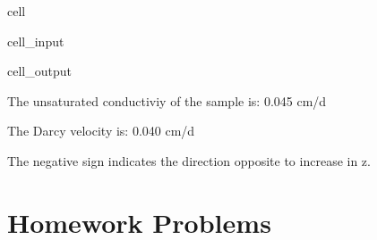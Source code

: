 \documentclass[letterpaper,10pt,english]{jupyterBook}
\begin{document}
\begin{sphinxuseclass}{cell}
\begin{sphinxVerbatimInput}
\begin{sphinxuseclass}{cell_input}
\begin{sphinxVerbatim}[commandchars=\\\{\}]
 
  
\end{sphinxVerbatim}

\end{sphinxuseclass}\end{sphinxVerbatimInput}
\begin{sphinxVerbatimOutput}

\begin{sphinxuseclass}{cell_output}
\begin{sphinxVerbatim}[commandchars=\\\{\}]
The unsaturated conductiviy of the sample is: 0.045 cm/d

The Darcy velocity is: \PYGZhy{}0.040 cm/d

The negative sign indicates the direction opposite to increase in z.
\end{sphinxVerbatim}

\end{sphinxuseclass}\end{sphinxVerbatimOutput}

\end{sphinxuseclass}

\section{Homework Problems}
\label{\detokenize{content/tutorials/T5/tutorial_05:homework-problems}}
\end{document}
